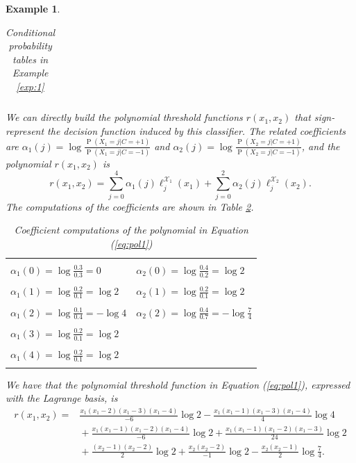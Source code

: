 \documentclass[11pt,a4paper, twoside]{book}
\newtheorem{example}{Example}[chapter]
\newcommand{\Pp}{\operatorname{P}}
\newcommand{\nchi}{\mathcal{X}}
\begin{document}
\begin{example}
\begin{table}
\begin{tabular}{llll}
 \end{tabular}
 \caption{Conditional probability tables in Example \ref{exp:1}}
\label{tab:condprob1}
\end{table}
We can directly build the polynomial threshold functions $r(x_1,x_2)$ that sign-represent the decision function induced by this classifier.
The related coefficients are $\alpha_{1}(j)=\log \frac{ \Pp(X_1=j|C=+1)}{\Pp(X_1=j|C=-1)}$ and $\alpha_{2}(j)=\log \frac{ \Pp(X_2=j|C=+1)}{\Pp(X_2=j|C=-1)}$, and the polynomial $r(x_1,x_2)$ is
\begin{equation} \label{eq:pol1} r(x_1,x_2)=\sum_{j=0}^{4} \alpha_1(j)\ell_{j}^{\nchi_1}(x_1)+\sum_{j=0}^{2} \alpha_2(j)\ell_{j}^{\nchi_2}(x_2).  \end{equation}
The computations of the coefficients are shown in Table \ref{tab:coefficients}.
\begin{table}
\centering
 \begin{tabular}{|l|l|}
\hline
& \\
$\alpha_1(0)=\log \frac{0.3}{0.3}=0$  &   $\alpha_2(0)=\log \frac{0.4}{0.2}=\log2 $
\\ & \\
$\alpha_1(1)=\log \frac{0.2}{0.1}=\log2$ &  $\alpha_2(1)=\log \frac{0.2}{0.1}=\log2$ 
\\ & \\
$\alpha_1(2)=\log \frac{0.1}{0.4}=-\log4$ &  $\alpha_2(2)=\log \frac{0.4}{0.7}=-\log\frac{7}{4} $
\\ & \\
$\alpha_1(3)=\log \frac{0.2}{0.1}=\log2$ &  
\\ & \\
$\alpha_1(4)=\log \frac{0.2}{0.1}=\log2$  &  \\
& \\
\hline
\end{tabular}  
\caption{{Coefficient computations of the polynomial in Equation (\ref{eq:pol1})} }
\label{tab:coefficients}
\end{table}
We have that the polynomial threshold function in Equation (\ref{eq:pol1}), expressed with the Lagrange basis, is
\begin{align*}
r(x_1,x_2)=& \frac{x_1(x_1-2)(x_1-3)(x_1-4)}{-6}\log2- \frac{{x_1}(x_1-1)(x_1-3)(x_1-4)}{4}\log4 \\
 &{}+\frac{x_1(x_1-1)(x_1-2)(x_1-4)}{-6}\log2+\frac{x_1(x_1-1)(x_1-2)(x_1-3)}{24}\log2 \\ 
 &{}+\frac{(x_2-1)(x_2-2)}{2}\log2+ \frac{x_2(x_2-2)}{-1} \log2-\frac{x_2(x_2-1)}{2}\log\frac{7}{4}. 
\end{align*}

\end{example}
\end{document}
